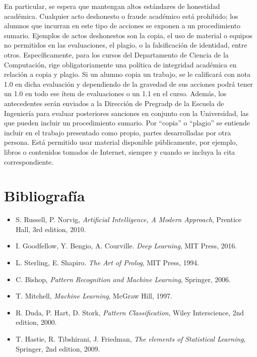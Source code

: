 \documentclass[11pt,letterpaper]{article}
\begin{document}
En particular, se espera que mantengan altos estándares de honestidad académica.
Cualquier acto deshonesto o fraude académico está prohibido; los alumnos que
incurran en este tipo de acciones se exponen a un procedimiento sumario.
Ejemplos de actos deshonestos son la copia, el uso de material o equipos no
permitidos en las evaluaciones, el plagio, o la falsificación de identidad,
entre otros. Específicamente, para los cursos del Departamento de Ciencia de la
Computación, rige obligatoriamente una política de integridad académica en
relación a copia y plagio. Si un alumno copia un trabajo, se le calificará con
nota 1.0 en dicha evaluación y dependiendo de la gravedad de sus acciones podrá
tener un 1.0 en todo ese ítem de evaluaciones o un 1.1 en el curso. Además, los
antecedentes serán enviados a la Dirección de Pregradp de la Escuela de
Ingeniería para evaluar posteriores sanciones en conjunto con la Universidad,
las que pueden incluir un procedimiento sumario. Por ``copia'' o ``plagio'' se
entiende incluir en el trabajo presentado como propio, partes desarrolladas por
otra persona. Está permitido usar material disponible públicamente, por ejemplo,
libros o contenidos tomados de Internet, siempre y cuando se incluya la cita
correspondiente.

\section{Bibliografía}
\begin{itemize}
  \item S. Russell, P. Norvig, \textit{Artificial Intelligence, A Modern Approach}, Prentice Hall, 3rd edition, 2010.
  \item I. Goodfellow, Y. Bengio, A. Courville. \textit{Deep Learning}, MIT Press, 2016.
  \item L. Sterling, E. Shapiro. \textit{The Art of Prolog}, MIT Press, 1994.
  \item C. Bishop, \textit{Pattern Recognition and Machine Learning}, Springer, 2006.
  \item T. Mitchell, \textit{Machine Learning}, McGraw Hill, 1997.
  \item R. Duda, P. Hart, D. Stork, \textit{Pattern Classification}, Wiley Interscience, 2nd edition, 2000.
  \item T. Hastie, R. Tibshirani, J. Friedman, \textit{The elements of Statistical Learning}, Springer, 2nd edition, 2009.
\end{itemize}
\end{document}
